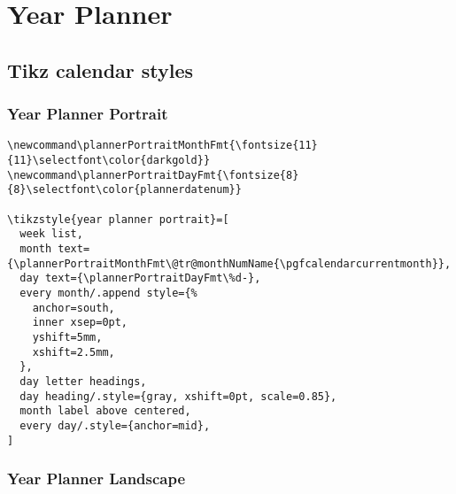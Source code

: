 \documentclass[11pt,oneside]{memoir-article}
\begin{document}
\chapter{Year Planner}
\label{sec:orgf40f335}
\section{Tikz calendar styles}
\label{sec:orge85789c}
\subsection{Year Planner Portrait}
\label{sec:orga6a744a}

\begin{verbatim}
\newcommand\plannerPortraitMonthFmt{\fontsize{11}{11}\selectfont\color{darkgold}}
\newcommand\plannerPortraitDayFmt{\fontsize{8}{8}\selectfont\color{plannerdatenum}}

\tikzstyle{year planner portrait}=[
  week list,
  month text={\plannerPortraitMonthFmt\@tr@monthNumName{\pgfcalendarcurrentmonth}},
  day text={\plannerPortraitDayFmt\%d-},
  every month/.append style={%
    anchor=south,
    inner xsep=0pt,
    yshift=5mm,
    xshift=2.5mm,
  },
  day letter headings,
  day heading/.style={gray, xshift=0pt, scale=0.85},
  month label above centered,
  every day/.style={anchor=mid},
]
\end{verbatim}

\subsection{Year Planner Landscape}
\label{sec:orgdf6c24d}
\end{document}

